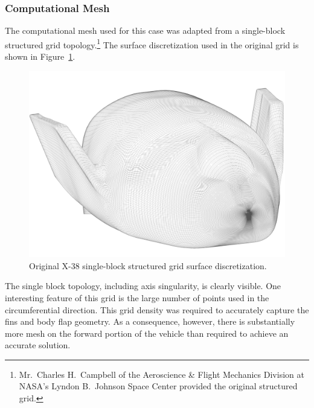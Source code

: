 \subsubsection{Computational Mesh}
  The computational mesh used for this case was adapted from a single-block structured grid topology.\footnote{Mr.\ Charles H.\ Campbell of the Aeroscience \& Flight Mechanics Division at NASA's Lyndon B.\ Johnson Space Center provided the original structured grid.}   The surface discretization used in the original grid is shown in Figure~\ref{fig:x38_orig_grid}.
\begin{figure}[hbtp]
  \begin{center}
    \includegraphics[width=.7\textwidth]{figures/x38/x38-orig_surf}
    \caption{Original X-38 single-block structured grid surface discretization.\label{fig:x38_orig_grid}}
  \end{center}
\end{figure}
The single block topology, including axis singularity, is clearly visible.  One interesting feature of this grid is the large number of points used in the circumferential direction.  This grid density was required to accurately capture the fins and body flap geometry.  As a consequence, however, there is substantially more mesh on the forward portion of the vehicle than required to achieve an accurate solution.

